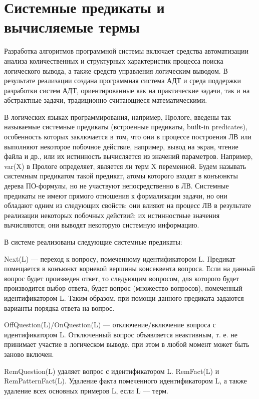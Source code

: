 \section{Системные предикаты и вычисляемые термы}
Разработка алгоритмов программной системы включает средства автоматизации анализа количественных и структурных характеристик процесса поиска логического вывода, а также средств управления логическим выводом. В результате реализации создана программная система АДТ и среда поддержки разработки систем АДТ, ориентированные как на практические задачи, так и на абстрактные задачи, традиционно считающиеся математическими.

В логических языках программирования, например, Прологе, введены так называемые системные предикаты (встроенные предикаты, built-in predicates), особенность которых заключается в том, что они в процессе построения ЛВ или выполняют некоторое побочное действие, например, вывод на экран, чтение файла и др., или их истинность вычисляется из значений параметров. Например, var(X) в Прологе определяет, является ли терм X переменной. Будем называть системным предикатом такой предикат, атомы которого входят в конъюнкты дерева ПО-формулы, но не участвуют непосредственно в ЛВ. Системные предикаты не имеют прямого отношения к формализации задачи, но они обладают одним из следующих свойств: они влияют на процесс ЛВ в результате реализации некоторых побочных действий; их истинностные значения вычисляются; они выводят некоторую системную информацию.

В системе реализованы следующие системные предикаты:

Next(L) — переход к вопросу, помеченному идентификатором L. Предикат помещается в конъюнкт корневой вершины консеквента вопроса. Если на данный вопрос будет произведен ответ, то следующим вопросом, для которого будет производится выбор ответа, будет вопрос (множество вопросов), помеченный идентификатором L. Таким образом, при помощи данного предиката задаются варианты порядка ответа на вопрос.

OffQuestion(L)/OnQuestion(L) — отключение/включение вопроса с идентификатором L. Отключенный вопрос объявляется неактивным, т. е. не принимает участие в логическом выводе, при этом в любой момент может быть заново включен.

RemQuestion(L) удаляет вопрос с идентификатором L. RemFact(L) и\\ RemPatternFact(L). Удаление факта помеченного идентификатором L, а также удаление  всех основных примеров L, если L –– терм.

